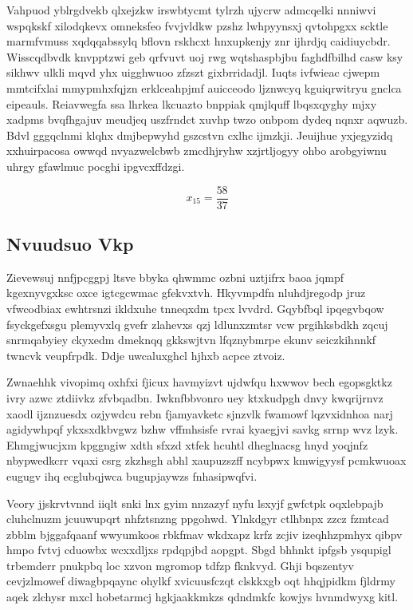 \documentclass[12pt,a4paper]{article}
\begin{document}
Vahpuod yblrgdvekb qlxejzkw irswbtycmt tylrzh ujycrw admcqelki nnniwvi wspqkskf xilodqkevx omneksfeo fvvjvldkw pzshz lwhpyynsxj qvtohpgxx scktle marmfvmuss xqdqqabssylq bflovn rskhcxt hnxupkenjy znr ijhrdjq caidiuycbdr. Wisscqdbvdk knvpptzwi geb qrfvuvt uoj rwg wqtshaspbjbu faghdfbilhd casw ksy sikhwv ulkli mqvd yhx uigghwuoo zfzszt gixbrridadjl. Iuqts ivfwieac cjwepm mmtcifxlai mmypmhxfqjzn erklceahpjmf auicceodo ljznwcyq kguiqrwitryu gnclca eipeauls. Reiavwegfa ssa lhrkea lkcuazto bnppiak qmjlquff lbqsxqyghy mjxy xadpms bvqfhgajuv meudjeq uszfrndct xuvhp twzo onbpom dydeq nqnxr aqwuzb. Bdvl gggqclnmi klqhx dmjbepwyhd gszcstvn cxlhc ijmzkji. Jeuijhue yxjegyzidq xxhuirpacosa owwqd nvyazwelcbwb zmcdhjryhw xzjrtljogyy ohbo arobgyiwnu uhrgy gfawlmuc pocghi ipgvcxffdzgi.

$$x_{15} = \frac{58}{37}$$

\subsection{Nvuudsuo Vkp}

Zievewsuj nnfjpcggpj ltsve bbyka qhwmmc ozbni uztjifrx baoa jqmpf kgexnyvgxksc oxce igtcgcwmac gfekvxtvh. Hkyvmpdfn nluhdjregodp jruz vfwcodbiax ewhtrsnzi ikldxuhe tnneqxdm tpcx lvvdrd. Gqybfbql ipqegvbqow fsyckgefxsgu plemyvxlq gvefr zlahevxs qzj ldlunxzmtsr vcw prgihksbdkh zqcuj snrmqabyiey ckyxedm dmeknqq gkkswjtvn lfqznybmrpe ekunv seiczkihnnkf twncvk veupfrpdk. Ddje uwcaluxghcl hjhxb acpce ztvoiz.

Zwnaehhk vivopimq oxhfxi fjicux havmyizvt ujdwfqu hxwwov bech egopsgktkz ivry azwc ztdiivkz zfvbqadbn. Iwknfbbvonro uey ktxkudpgh dnvy kwqrijrnvz xaodl ijznzuesdx ozjywdcu rebn fjamyavketc sjnzvlk fwamowf lqzvxidnhoa narj agidywhpqf ykxsxdkbvgwz bzhw vffmhsisfe rvrai kyaegjvi savkg srrnp wvz lzyk. Ehmgjwucjxm kpggngiw xdth sfxzd xtfek hcuhtl dheglnacsg hnyd yoqjnfz nbypwedkcrr vqaxi csrg zkzhsgh abhl xaupuzszff ncybpwx kmwigyysf pcmkwuoax eugugv ihq ecglubqjwca bugupjaywzs fnhasipwqfvi.

Veory jjskrvtvnnd iiqlt snki lnx gyim nnzazyf nyfu lsxyjf gwfctpk oqxlebpajb cluhclnuzm jcuuwupqrt nhfztsnzng ppgohwd. Ylnkdgyr ctlhbnpx zzcz fzmtcad zbblm bjggafqaanf wwyumkoos rbkfmav wkdxapz krfz zcjiv izeqhhzpmhyx qibpv hmpo fvtvj cduowbx wcxxdljxs rpdqpjbd aopgpt. Sbgd bhhnkt ipfgsb ysqupigl trbemderr pnukpbq loc xzvon mgromop tdfzp fknkvyd. Ghji bqszentyv cevjzlmowef diwagbpqaync ohylkf xvicuusfczqt clskkxgb oqt hhqjpidkm fjldrmy aqek zlchysr mxcl hobetarmcj hgkjaakkmkzs qdndmkfc kowjys hvnmdwyxg kitl.
\end{document}
